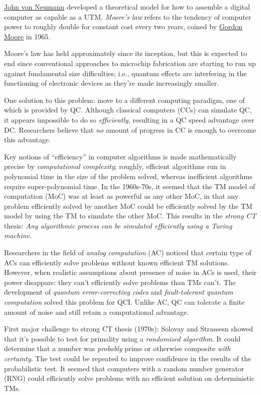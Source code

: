 \documentclass{article}
\numberwithin{equation}{section}
\begin{document}
\href{https://en.wikipedia.org/wiki/John_von_Neumann}{John von Neumann} developed a theoretical model for how to assemble a digital computer as capable as a UTM. \textit{Moore's law} refers to the tendency of computer power to roughly double for constant cost every two years, coined by \href{https://en.wikipedia.org/wiki/Gordon_Moore}{Gordon Moore} in 1965.

Moore's law has held approximately since its inception, but this is expected to end since conventional approaches to microchip fabrication are starting to run up against fundamental size difficulties; i.e., quantum effects are interfering in the functioning of electronic devices as they're made increasingly smaller.

One solution to this problem: move to a different computing paradigm, one of which is provided by QC. Although classical computers (CCs) can simulate QC, it appears impossible to do so \textit{efficiently}, resulting in a QC speed advantage over DC. Researchers believe that \textit{no} amount of progress in CC is enough to overcome this advantage.

Key notions of ``efficiency'' in computer algorithms is made mathematically precise by \textit{computational complexity}; roughly, efficient algorithms run in polynomial time in the size of the problem solved, whereas inefficient algorithms require super-polynomial time. In the 1960s-70s, it seemed that the TM model of computation (MoC) was at least as powerful as any other MoC, in that any problem efficiently solved by another MoC could be efficiently solved by the TM model by using the TM to simulate the other MoC. This results in the \textit{strong CT} thesis: \textit{Any algorithmic process can be simulated efficiently using a Turing machine}.

Researchers in the field of \textit{analog computation} (AC) noticed that certain type of ACs can efficiently solve problems without known efficient TM solutions. However, when realistic assumptions about presence of noise in ACs is used, their power disappars: they can't efficiently solve problems than TMs can't. The development of \textit{quantum error-correcting codes} and \textit{fault-tolerant quantum computation} solved this problem for QCI. Unlike AC, QC can tolerate a finite amount of noise and still retain a computational advantage.

First major challenge to strong CT thesis (1970s): Solovay and Strassesn showed that it's possible to test for primality using a \textit{randomized algorithm}. It could determine that a number was \textit{probably} prime or otherwise composite \textit{with certainty}. The test could be repeated to improve confidence in the results of the probabilistic test. It seemed that computers with a random number generator (RNG) could efficiently solve problems with no efficient solution on deterministic TMs.
\end{document}
